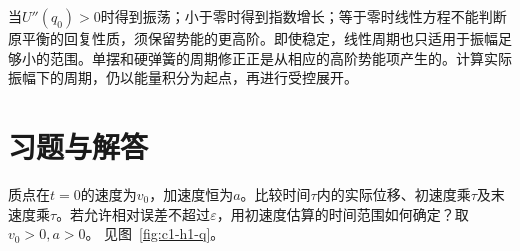 当$U''(q_0)>0$时得到振荡；小于零时得到指数增长；等于零时线性方程不能判断原平衡的回复性质，须保留势能的更高阶。即使稳定，线性周期也只适用于振幅足够小的范围。单摆和硬弹簧的周期修正正是从相应的高阶势能项产生的。计算实际振幅下的周期，仍以能量积分为起点，再进行受控展开。


\section{习题与解答}\label{sec:c1-exercises}

\begin{exercise}[位移中的二阶项]\label{ex:c1-h1}
质点在$t=0$的速度为$v_0$，加速度恒为$a$。比较时间$\tau$内的实际位移、初速度乘$\tau$及末速度乘$\tau$。若允许相对误差不超过$\varepsilon$，用初速度估算的时间范围如何确定？取$v_0>0,a>0$。 见图~\ref{fig:c1-h1-q}。
\end{exercise}

